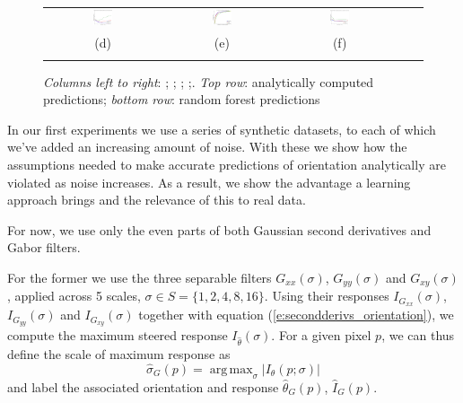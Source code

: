 \documentclass{IEEEtran}
\newcommand{\eref}[1]{(\ref{#1})}
\def\Gxxs{G_{xx}(\sigma)}
\def\Gxys{G_{xy}(\sigma)}
\def\Gyys{G_{yy}(\sigma)}
\def\Ixxs{I_{G_{xx}}(\sigma)}
\def\Ixys{I_{G_{xy}}(\sigma)}
\def\Iyys{I_{G_{yy}}(\sigma)}
\DeclareMathOperator*{\argmax}{arg\,max}
\begin{document}
\begin{figure}[t]
\begin{tabular}{@{}c c c c c@{}}
\includegraphics[width=0.18\textwidth]{figs/synthetic/syn_lines_g2d_RF_scales_v_width} &
\includegraphics[width=0.18\textwidth]{figs/retina/ret_vessels_g2d_RF_scales_cdf} &
\includegraphics[width=0.18\textwidth]{figs/retina/ret_vessels_g2d_RF_scales_v_width} \\
(d) & (e) & (f)& &\\
\noalign{\smallskip}
\end{tabular}
%
\caption{\emph{Columns left to right}: ; ; ; ;. \emph{Top row}: analytically computed predictions; \emph{bottom row}: random forest predictions}
\label{f:synthetic_exp2}
\end{figure}
%
In our first experiments we use a series of synthetic datasets, to each of which we've added an increasing amount of noise. With these we show how the assumptions needed to make accurate predictions of orientation analytically are violated as noise increases. As a result, we show the advantage a learning approach brings and the relevance of this to real data.

For now, we use only the even parts of both Gaussian second derivatives and Gabor filters.

For the former we use the three separable filters $\Gxxs$, $\Gyys$ and $\Gxys$, applied across 5 scales, $\sigma \in S=\{1, 2, 4, 8, 16\}$. Using their responses $\Ixxs$, $\Iyys$ and $\Ixys$ together with equation \eref{e:secondderivs_orientation}, we compute the maximum steered response $I_{\hat{\theta}}(\sigma)$. For a given pixel $p$, we can thus define the scale of maximum response as
%
\begin{equation}
\hat{\sigma}_G(p) = \argmax_{\sigma} |I_{\theta}(p ; \sigma)|
\label{e:max_scale_gauss}
\end{equation}
%
and label the associated orientation and response $\hat{\theta}_G(p)$, $\hat{I}_{G}(p)$.
\end{document}
